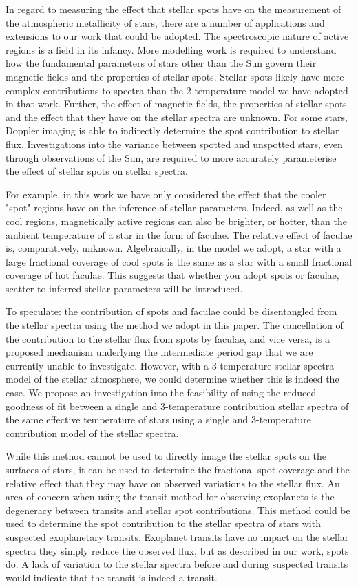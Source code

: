 In regard to measuring the effect that stellar spots have on the measurement of the atmospheric metallicity of stars, there are a number of applications and extensions to our work that could be adopted.
The spectroscopic nature of active regions is a field in its infancy.
More modelling work is required to understand how the fundamental parameters of stars other than the Sun govern their magnetic fields and the properties of stellar spots.
Stellar spots likely have more complex contributions to spectra than the 2-temperature model we have adopted in that work.
Further, the effect of magnetic fields, the properties of stellar spots and the effect that they have on the stellar spectra are unknown.
For some stars, Doppler imaging is able to indirectly determine the spot contribution to stellar flux.
Investigations into the variance between spotted and unspotted stars, even through observations of the Sun, are required to more accurately parameterise the effect of stellar spots on stellar spectra.

For example, in this work we have only considered the effect that the cooler "spot" regions have on the inference of stellar parameters.
Indeed, as well as the cool regions, magnetically active regions can also be brighter, or hotter, than the ambient temperature of a star in the form of faculae.
The relative effect of faculae is, comparatively, unknown.
Algebraically, in the model we adopt, a star with a large fractional coverage of cool spots is the same as a star with a small fractional coverage of hot faculae.
This suggests that whether you adopt spots or faculae, scatter to inferred stellar parameters will be introduced.

To speculate: the contribution of spots and faculae could be disentangled from the stellar spectra using the method we adopt in this paper.
The cancellation of the contribution to the stellar flux from spots by faculae, and vice versa, is a proposed mechanism underlying the intermediate period gap that we are currently unable to investigate.
However, with a 3-temperature stellar spectra model of the stellar atmosphere, we could determine whether this is indeed the case.
We propose an investigation into the feasibility of using the reduced goodness of fit between a single and 3-temperature contribution stellar spectra of the same effective temperature of stars using a single and 3-temperature contribution model of the stellar spectra.

While this method cannot be used to directly image the stellar spots on the surfaces of stars, it can be used to determine the fractional spot coverage and the relative effect that they may have on observed variations to the stellar flux.
An area of concern when using the transit method for observing exoplanets is the degeneracy between transits and stellar spot contributions.
This method could be used to determine the spot contribution to the stellar spectra of stars with suspected exoplanetary transits.
Exoplanet transits have no impact on the stellar spectra they simply reduce the observed flux, but as described in our work, spots do.
A lack of variation to the stellar spectra before and during suspected transits would indicate that the transit is indeed a transit.

